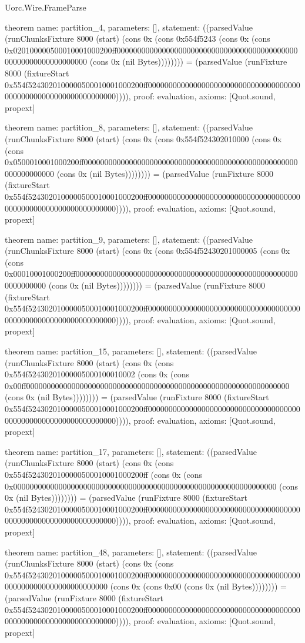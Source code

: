 \begin{lexlean}{Uorc.Wire.FrameParse}
\begin{semanticmodule}
theorem{
  name: partition_4,
  parameters: [],
  statement: ((parsedValue (runChunksFixture 8000 (start) (cons 0x (cons 0x554f5243 (cons 0x (cons 0x020100000500010001000200ff0000000000000000000000000000000000000000000000000000000000000000 (cons 0x (nil Bytes)))))))) = (parsedValue (runFixture 8000 (fixtureStart 0x554f5243020100000500010001000200ff0000000000000000000000000000000000000000000000000000000000000000)))),
  proof: evaluation{},
  axioms: [Quot.sound, propext]
}

theorem{
  name: partition_8,
  parameters: [],
  statement: ((parsedValue (runChunksFixture 8000 (start) (cons 0x (cons 0x554f524302010000 (cons 0x (cons 0x0500010001000200ff0000000000000000000000000000000000000000000000000000000000000000 (cons 0x (nil Bytes)))))))) = (parsedValue (runFixture 8000 (fixtureStart 0x554f5243020100000500010001000200ff0000000000000000000000000000000000000000000000000000000000000000)))),
  proof: evaluation{},
  axioms: [Quot.sound, propext]
}

theorem{
  name: partition_9,
  parameters: [],
  statement: ((parsedValue (runChunksFixture 8000 (start) (cons 0x (cons 0x554f52430201000005 (cons 0x (cons 0x00010001000200ff0000000000000000000000000000000000000000000000000000000000000000 (cons 0x (nil Bytes)))))))) = (parsedValue (runFixture 8000 (fixtureStart 0x554f5243020100000500010001000200ff0000000000000000000000000000000000000000000000000000000000000000)))),
  proof: evaluation{},
  axioms: [Quot.sound, propext]
}

theorem{
  name: partition_15,
  parameters: [],
  statement: ((parsedValue (runChunksFixture 8000 (start) (cons 0x (cons 0x554f52430201000005000100010002 (cons 0x (cons 0x00ff0000000000000000000000000000000000000000000000000000000000000000 (cons 0x (nil Bytes)))))))) = (parsedValue (runFixture 8000 (fixtureStart 0x554f5243020100000500010001000200ff0000000000000000000000000000000000000000000000000000000000000000)))),
  proof: evaluation{},
  axioms: [Quot.sound, propext]
}

theorem{
  name: partition_17,
  parameters: [],
  statement: ((parsedValue (runChunksFixture 8000 (start) (cons 0x (cons 0x554f5243020100000500010001000200ff (cons 0x (cons 0x0000000000000000000000000000000000000000000000000000000000000000 (cons 0x (nil Bytes)))))))) = (parsedValue (runFixture 8000 (fixtureStart 0x554f5243020100000500010001000200ff0000000000000000000000000000000000000000000000000000000000000000)))),
  proof: evaluation{},
  axioms: [Quot.sound, propext]
}

theorem{
  name: partition_48,
  parameters: [],
  statement: ((parsedValue (runChunksFixture 8000 (start) (cons 0x (cons 0x554f5243020100000500010001000200ff00000000000000000000000000000000000000000000000000000000000000 (cons 0x (cons 0x00 (cons 0x (nil Bytes)))))))) = (parsedValue (runFixture 8000 (fixtureStart 0x554f5243020100000500010001000200ff0000000000000000000000000000000000000000000000000000000000000000)))),
  proof: evaluation{},
  axioms: [Quot.sound, propext]
}


\end{semanticmodule}
\end{lexlean}
